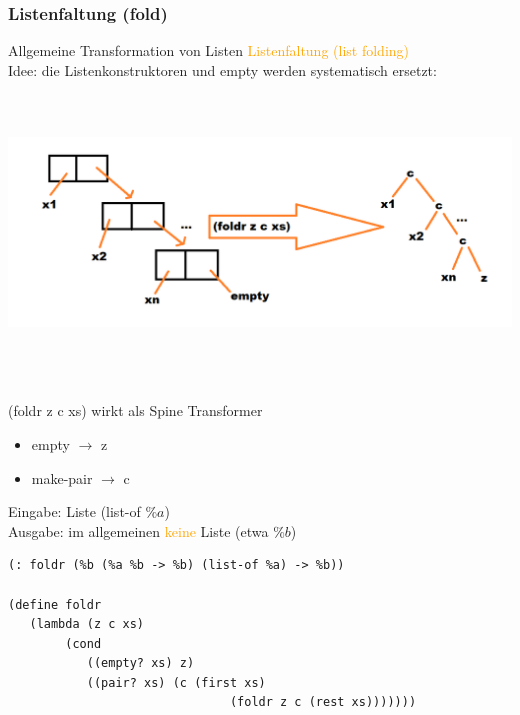 \documentclass[paper=a4, fontsize=11pt]{scrartcl}
\numberwithin{equation}{section}
\numberwithin{figure}{section}
\numberwithin{table}{section}
\begin{document}
\begin{lstlistig}
\subsubsection{Listenfaltung (fold)}
Allgemeine Transformation von Listen \textcolor{orange}{Listenfaltung (list folding)} \\
Idee: die Listenkonstruktoren und empty werden systematisch ersetzt: \\

\includegraphics[width=15cm,height=8cm]{foldr.png}

(foldr z c xs) wirkt als Spine Transformer \\
\begin{itemize}
\item empty $\rightarrow$ z
\item make-pair $\rightarrow$ c
\end{itemize}

Eingabe: Liste (list-of $\%a$) \\
Ausgabe: im allgemeinen \textcolor{orange}{keine} Liste (etwa $\%b$)

\begin{lstlisting}
(: foldr (%b (%a %b -> %b) (list-of %a) -> %b))

(define foldr
   (lambda (z c xs)
        (cond
           ((empty? xs) z)
           ((pair? xs) (c (first xs)
                               (foldr z c (rest xs)))))))
\end{lstlisting}


\end{lstlistig}
\end{document}
